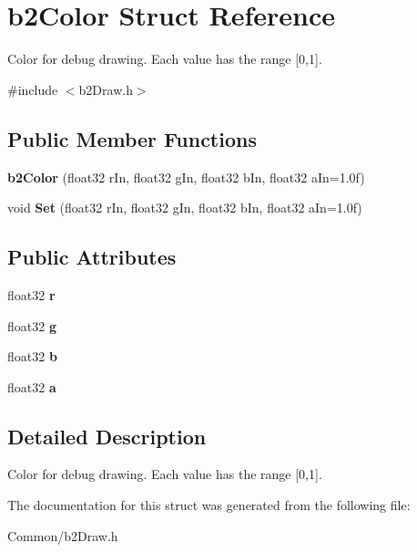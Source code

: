 \hypertarget{structb2Color}{}\section{b2\+Color Struct Reference}
\label{structb2Color}


Color for debug drawing. Each value has the range \mbox{[}0,1\mbox{]}.  




{\ttfamily \#include $<$b2\+Draw.\+h$>$}

\subsection*{Public Member Functions}
\begin{DoxyCompactItemize}
\item 
\mbox{\label{structb2Color_a7cceec6dae0dccd757f35eacd41595c6}} 
{\bfseries b2\+Color} (float32 r\+In, float32 g\+In, float32 b\+In, float32 a\+In=1.\+0f)
\item 
\mbox{\label{structb2Color_aecd71c7fe34182071a5e4699c4fd5cae}} 
void {\bfseries Set} (float32 r\+In, float32 g\+In, float32 b\+In, float32 a\+In=1.\+0f)
\end{DoxyCompactItemize}
\subsection*{Public Attributes}
\begin{DoxyCompactItemize}
\item 
\mbox{\label{structb2Color_a9ab6c9a910caee177d96980b74ffb00b}} 
float32 {\bfseries r}
\item 
\mbox{\label{structb2Color_a241c742352403ec456b51ac5f2abe7d9}} 
float32 {\bfseries g}
\item 
\mbox{\label{structb2Color_a9e7380d27a63010cfad49b97f66dcd26}} 
float32 {\bfseries b}
\item 
\mbox{\label{structb2Color_adf752d6bc4b05221be1d964e47cf716d}} 
float32 {\bfseries a}
\end{DoxyCompactItemize}


\subsection{Detailed Description}
Color for debug drawing. Each value has the range \mbox{[}0,1\mbox{]}. 

The documentation for this struct was generated from the following file\+:\begin{DoxyCompactItemize}
\item 
Common/b2\+Draw.\+h\end{DoxyCompactItemize}
